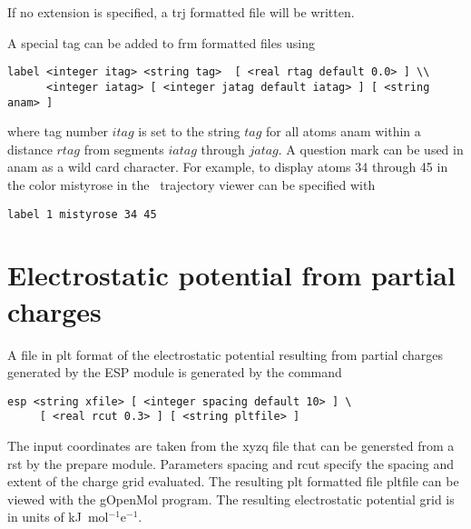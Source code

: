 If no extension is specified, a {\rm trj} formatted file will be written.

A special tag can be added to {\rm frm} formatted files  using

\begin{verbatim}
label <integer itag> <string tag>  [ <real rtag default 0.0> ] \\
      <integer iatag> [ <integer jatag default iatag> ] [ <string anam> ]
\end{verbatim}

where tag number $itag$ is set to the string $tag$ for all atoms
anam within a distance $rtag$ from segments $iatag$ through $jatag$.
A question mark can be used in anam as a wild card character.
For example, to display atoms 34 through 45 in the color mistyrose
in the \ecce\ trajectory viewer can be specified with

\begin{verbatim}
label 1 mistyrose 34 45
\end{verbatim}

\section{Electrostatic potential from partial charges}

A file in plt format of the electrostatic potential resulting
from partial charges generated by the ESP module is generated
by the command

\begin{verbatim}
esp <string xfile> [ <integer spacing default 10> ] \
     [ <real rcut 0.3> ] [ <string pltfile> ]
\end{verbatim}

The input coordinates are taken from the {\rm xyzq} file that can
be genersted from a {\rm rst} by the prepare module. Parameters 
spacing and rcut specify the spacing and extent of the charge grid
evaluated. The resulting {\rm plt} formatted file pltfile can be
viewed with the gOpenMol program. The resulting electrostatic 
potential grid is in units of kJ\ mol$^{-1}$e$^{-1}$.

